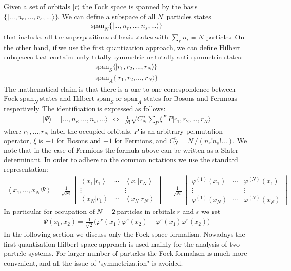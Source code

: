 \documentclass[onecolumn,fleqn, 11pt]{revtex4}
\newcommand{\beq}{\begin{eqnarray}}
\newcommand{\eeq}{\end{eqnarray}}
\begin{document}
 
Given a set of orbitals $|r\rangle$ the Fock space is spanned 
by the basis ${ \{ |...,n_r,...,n_s,...\rangle \} }$. 
We can define a subspace of all $N$~particles states  
\beq    
\mbox{span}_N\{ |...,n_r,...,n_s,...\rangle  \}
\eeq
that includes all the superpositions of 
basis states with $\sum_r n_r=N$ particles.
On the other hand, if we use the first quantization approach,  
we can define Hilbert subspaces that contains 
only totally symmetric or totally anti-symmetric states:
\beq    
\mbox{span}_S\{ |r_1,r_2,...,r_N\rangle  \} 
\\ \nonumber
\mbox{span}_A\{ |r_1,r_2,...,r_N\rangle  \}
\eeq
The mathematical claim is that there is a one-to-one 
correspondence between Fock $\mbox{span}_N$ states    
and Hilbert $\mbox{span}_S$ or $\mbox{span}_A$ states 
for Bosons and Fermions respectively. 
The identification is expressed as follows:
\beq 
|\Psi\rangle = |...,n_r,...,n_s,...\rangle 
\ \ \Longleftrightarrow  \ \
\frac{1}{N!}\sqrt{C^n_N}\sum_P \xi^P \ P |r_1,r_2,...,r_N\rangle 
\eeq
where ${r_1,...,r_N}$ label the occupied orbitals, 
$P$ is an arbitrary permutation operator, 
$\xi$ is $+1$ for Bosons and $-1$ for Fermions, 
and ${C^n_N=N!/(n_r!n_s!...)}$.    
We note that in the case of Fermions the 
formula above can be written as a Slater determinant.
In order to adhere to the common notations 
we use the standard representation:  
\beq
\left\langle x_{1},...,x_{N}| \Psi \right\rangle 
= 
\frac{1}{\sqrt{N!}} 
\begin{vmatrix} 
\left\langle x_{1}|r_{1}\right\rangle  
& \cdots & \left\langle x_{1} |r_{N}\right\rangle \\ 
\vdots &  & \vdots\\ 
\left\langle x_{N}|r_{1}\right\rangle  
& \cdots & \left\langle x_{N} |r_{N}\right\rangle 
\end{vmatrix} 
= 
\frac{1}{\sqrt{N!}} 
\begin{vmatrix} 
\varphi^{(1)}(x_{1})  
& \cdots & \varphi^{(N)}(x_{1}) \\ 
\vdots &  & \vdots\\ 
\varphi^{(1)}(x_{N})  
& \cdots &  \varphi^{(N)}(x_{N})  
\end{vmatrix} 
\eeq
In particular for occupation of $N=2$ particles 
in orbitals $r$ and $s$ we get  
\beq
\Psi(x_1,x_2) = \frac{1}{\sqrt{2}}
\Big(\varphi^r(x_1)\varphi^s(x_2) -\varphi^s(x_1)\varphi^r(x_2)\Big)   
\eeq
In the following section we discuss only the Fock space formalism.
Nowadays the first quantization Hilbert space approach is used 
mainly for the analysis of two particle systems. For larger number 
of particles the Fock formalism is much more convenient, and all the 
issue of "symmetrization" is avoided.
\end{document}
